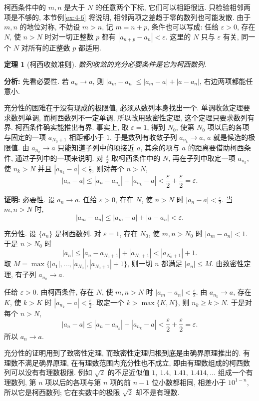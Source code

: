 \documentclass[UTF8,openany]{ctexbook}
\theoremstyle{chinesetextbook}
\newtheorem{theorem}{定理}[section]
\newenvironment{cnproof}{\par\indent\textbf{证明:} \ignorespaces}{\par}
\begin{document}
柯西条件中的 $m,n$ 是大于 $N$ 的任意两个下标, 它们可以相距很远. 只检验相邻两项是不够的, 本节例\ref{ex:4-6} 将说明, 相邻两项之差趋于零的数列也可能发散. 由于 $m,n$ 的地位对称, 不妨设 $m>n$, 记 $m=n+p$, 条件也可以写成: 任给 $\varepsilon>0$, 存在 $N$, 使 $n>N$ 时对一切正整数 $p$ 都有 $|a_{n+p}-a_n|<\varepsilon$. 这里的 $N$ 只与 $\varepsilon$ 有关, 同一个 $N$ 对所有的正整数 $p$ 都适用.
\begin{theorem}[柯西收敛准则]
数列收敛的充分必要条件是它为柯西数列.
\end{theorem}
\par\indent\textbf{分析:} 先看必要性. 若 $a_n\to a$, 则 $|a_m-a_n|\le|a_m-a|+|a-a_n|$, 右边两项都能任意小.

充分性的困难在于没有现成的极限值, 必须从数列本身找出一个. 单调收敛定理要求数列单调, 而柯西数列不一定单调, 所以改用致密性定理, 这个定理只要求数列有界. 柯西条件确实能推出有界. 事实上, 取 $\varepsilon=1$, 得到 $N_0$, 使第 $N_0$ 项以后的各项与固定的一项 $a_{N_0+1}$ 相距都小于 $1$. 于是数列有收敛子列 $a_{n_k}\to a$, $a$ 就是候选的极限值. 由 $a_{n_k}\to a$ 只能知道子列中的项接近 $a$, 其余的项与 $a$ 的距离要借助柯西条件, 通过子列中的一项来说明. 对 $\displaystyle\frac\varepsilon2$ 取柯西条件中的 $N$, 再在子列中取定一项 $a_{n_k}$, 使 $n_k>N$ 并且 $\displaystyle|a_{n_k}-a|<\frac\varepsilon2$, 则对每个 $n>N$,
\[
|a_n-a|\le|a_n-a_{n_k}|+|a_{n_k}-a|<\frac\varepsilon2+\frac\varepsilon2=\varepsilon.
\]
\begin{cnproof}
必要性. 设 $a_n\to a$. 任给 $\varepsilon>0$, 存在 $N$, 使 $n>N$ 时 $\displaystyle|a_n-a|<\frac\varepsilon2$. 当 $m,n>N$ 时,
\[
|a_m-a_n|\le|a_m-a|+|a-a_n|<\varepsilon.
\]

充分性. 设 $\{a_n\}$ 是柯西数列. 对 $\varepsilon=1$, 存在 $N_0$, 使 $m,n>N_0$ 时 $|a_m-a_n|<1$. 于是 $n>N_0$ 时
\[
|a_n|\le|a_n-a_{N_0+1}|+|a_{N_0+1}|<|a_{N_0+1}|+1.
\]
取 $M=\max\{|a_1|,\ldots,|a_{N_0}|,|a_{N_0+1}|+1\}$, 则一切 $n$ 都满足 $|a_n|\le M$. 由致密性定理, 有子列 $a_{n_k}\to a$.

任给 $\varepsilon>0$. 由柯西条件, 存在 $N$, 使 $m,n>N$ 时 $\displaystyle|a_m-a_n|<\frac\varepsilon2$. 由 $a_{n_k}\to a$, 存在 $K$, 使 $k>K$ 时 $\displaystyle|a_{n_k}-a|<\frac\varepsilon2$. 取定一个 $k>\max\{K,N\}$, 则 $n_k\ge k>N$. 于是对每个 $n>N$,
\[
|a_n-a|\le|a_n-a_{n_k}|+|a_{n_k}-a|<\frac\varepsilon2+\frac\varepsilon2=\varepsilon.
\]
所以 $a_n\to a$.
\end{cnproof}
充分性的证明用到了致密性定理, 而致密性定理归根到底是由确界原理推出的. 有理数不满足确界原理, 在有理数范围内充分性也不成立, 即由有理数组成的柯西数列可以没有有理数极限. 例如 $\sqrt2$ 的不足近似值 $1,\ 1.4,\ 1.41,\ 1.414,\ldots$ 组成一个有理数列, 第 $n$ 项以后的各项与第 $n$ 项的前 $n-1$ 位小数都相同, 相差小于 $10^{1-n}$, 所以它是柯西数列; 它在实数中的极限 $\sqrt2$ 却不是有理数.
\end{document}
